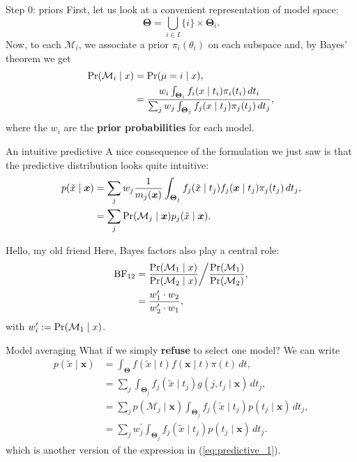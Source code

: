 \begin{frame}{Step 0: priors}
First, let us look at a convenient representation of model space:
\begin{equation*}
 \boldsymbol{\Theta} = \bigcup_{i \in I} \{i\} \times \boldsymbol{\Theta}_i.
\end{equation*}
Now, to each $\mathcal{M}_i$, we associate a prior $\pi_i(\theta_i)$  on each subspace and, by Bayes' theorem we get
\begin{align*}
 \operatorname{Pr}(\mathcal{M}_i \mid x) & = \operatorname{Pr}( \mu = i \mid x), \\ 
 &= \frac{w_i \int_{\boldsymbol{\Theta}_i} f_i(x\mid t_i)\pi_i(t_i)\,dt_i}{\sum_{j} w_j \int_{\boldsymbol{\Theta}_j} f_j(x\mid t_j)\pi_j(t_j)\,dt_j },
\end{align*}
where the $w_i$ are the \textbf{prior probabilities} for each model.
\end{frame}
\begin{frame}{An intuitive predictive}
A nice consequence of the formulation we just saw is that the predictive distribution looks quite intuitive:
\begin{align}
\nonumber
 p(\tilde{x} \mid \boldsymbol{x}) &= \sum_{j} w_j \frac{1}{m_j(\boldsymbol{x})}\int_{\boldsymbol{\Theta}_j} f_j(\tilde{x} \mid t_j) f_j(\boldsymbol{x}\mid t_j)\pi_j(t_j)\,dt_j,\\
 \label{eq:predictive_1}
 &= \sum_{j} \operatorname{Pr}(\mathcal{M}_j \mid \boldsymbol{x}) p_j(\tilde{x} \mid \boldsymbol{x}).
\end{align}
\end{frame}
\begin{frame}{Hello, my old friend}
Here, Bayes factors also play a central role:
\begin{align*}
 \operatorname{BF}_{12} &= \frac{\operatorname{Pr}(\mathcal{M}_1 \mid x)}{\operatorname{Pr}(\mathcal{M}_2 \mid x)}\bigg/\frac{\operatorname{Pr}(\mathcal{M}_1)}{\operatorname{Pr}(\mathcal{M}_2)},\\
  &= \frac{w_1^\prime \cdot w_2}{w_2^\prime \cdot w_1},
\end{align*}
with $w_i^\prime := \operatorname{Pr}(\mathcal{M}_1 \mid x)$.
\end{frame}
\begin{frame}{Model averaging}
What if we simply \textbf{refuse} to select one model?
We can write
\begin{align}
 \nonumber
 p(\tilde{x} \mid \boldsymbol{x})  &= \int_{\boldsymbol{\Theta}} f(\tilde{x} \mid t) f(\boldsymbol{x}\mid t)\pi(t)\,dt,\\
 \nonumber
 &= \sum_{j} \int_{\boldsymbol{\Theta}_j} f_j(\tilde{x} \mid t_j) g(j, t_j \mid \boldsymbol{x})\,dt_j,\\
 \nonumber
 &= \sum_j p (\mathcal{M}_j \mid \boldsymbol{x}) \int_{\boldsymbol{\Theta}_j} f_j(\tilde{x} \mid t_j) p(t_j \mid \boldsymbol{x})\,dt_j,\\
 \label{eq:predictive_2}
  &= \sum_j w_j^\prime \int_{\boldsymbol{\Theta}_j} f_j(\tilde{x} \mid t_j) p(t_j \mid \boldsymbol{x})\,dt_j.
\end{align}
which is another version of the expression in (\ref{eq:predictive_1}).
\end{frame}
